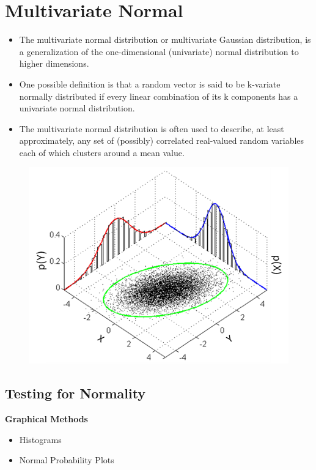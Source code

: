 \documentclass[]{report}
\begin{document}
{\section{Multivariate Normal}
{\large
	\begin{itemize}
		\item The multivariate normal distribution or multivariate Gaussian distribution, is a generalization of the one-dimensional (univariate) normal distribution to higher dimensions.\item One possible definition is that a random vector is said to be k-variate normally distributed if every linear combination of its k components has a univariate normal distribution. 
		\item The multivariate normal distribution is often used to describe, at least approximately, any set of (possibly) correlated real-valued random variables each of which clusters around a mean value.
	\end{itemize}
}
\begin{figure}[h!]
	\centering
	\includegraphics[width=0.7\linewidth]{./793px-MultivariateNormal}
	\caption{}
	\label{fig:793px-MultivariateNormal}
\end{figure}
\newpage
\subsection{Testing for Normality}
{
	\large
	\textbf{Graphical Methods}
	\begin{itemize}
		\item Histograms
		\item Normal Probability Plots
	\end{itemize}
	
}}
\end{document}
